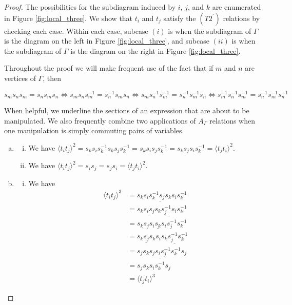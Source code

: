 \documentclass[11pt]{amsart}
\theoremstyle{definition}
\begin{document}
\begin{proof}
The possibilities for the subdiagram induced by $i$, $j$, and $k$ are enumerated in Figure \ref{fig:local_three}.  We show that $t_i$ and $t_j$ satisfy the $(T2^\prime)$ relations by checking each case.  Within each case, subcase $(i)$ is when the subdiagram of $\Gamma$ is the diagram on the left in Figure \ref{fig:local_three}, and subcase $(ii)$ is when the subdiagram of $\Gamma$ is the diagram on the right in Figure \ref{fig:local_three}.

Throughout the proof we will make frequent use of the fact that if $m$ and $n$ are vertices of $\Gamma$, then

$$s_ms_ns_m = s_ns_ms_n \Leftrightarrow s_ms_ns_m^{-1} = s_n^{-1}s_ms_n \Leftrightarrow s_ms_n^{-1}s_m^{-1} = s_n^{-1}s_m^{-1}s_n \Leftrightarrow s_m^{-1}s_n^{-1}s_m^{-1} = s_n^{-1}s_m^{-1}s_n^{-1}$$

When helpful, we underline the sections of an expression that are about to be manipulated. We also frequently combine two applications of $A_{\Gamma}$ relations when one manipulation is simply commuting pairs of variables.


\begin{enumerate}[a)]
\item
\begin{enumerate}[i)]
\item We have $\langle t_it_j \rangle^{2} = s_ks_is_k^{-1}s_ks_js_k^{-1} = s_ks_is_js_k^{-1} = s_ks_js_is_k^{-1} = \langle t_jt_i \rangle^{2}$.
\item We have $\langle t_it_j \rangle^{2} = s_is_j = s_js_i = \langle t_jt_i \rangle^{2}$.
\end{enumerate}
\item
\begin{enumerate}[i)]
\item We have
\begin{align*}
\langle t_it_j \rangle^{3} &= s_ks_i\underline{s_k^{-1}s_js_k}s_is_k^{-1}\\
&= s_k\underline{s_is_j}s_k\underline{s_j^{-1}s_i}s_k^{-1}\\
&= s_ks_j\underline{s_is_ks_i}s_j^{-1}s_k^{-1}\\
&= \underline{s_ks_js_k}s_i\underline{s_ks_j^{-1}s_k^{-1}}\\
&= s_js_k\underline{s_js_is_j^{-1}}s_k^{-1}s_j\\
&= s_js_ks_is_k^{-1}s_j\\
&= \langle t_jt_i \rangle^{3}
\end{align*}


\end{enumerate}
\end{enumerate}
\end{proof}
\end{document}
